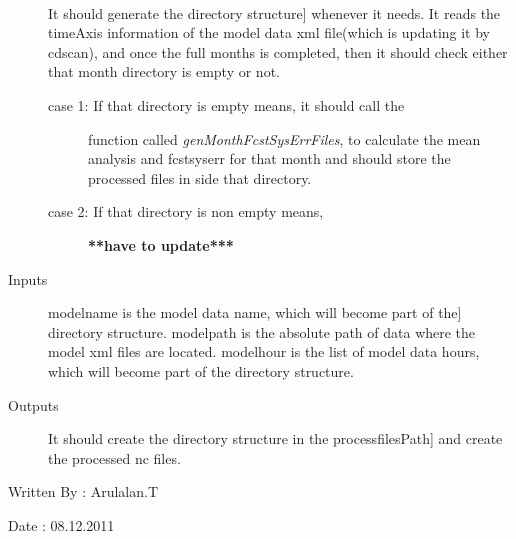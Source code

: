 \documentclass[letterpaper,10pt,english]{sphinxmanual}
\begin{document}
\begin{fulllineitems}
\label{diagnosis:compute_month_fcst_sys_error.genMonthFcstSysErrDirs}~\begin{description}
\item[{}] \leavevmode{[}It should generate the directory structure{]}
whenever it needs. It reads the timeAxis information of the
model data xml file(which is updating it by cdscan), and once
the full months is completed, then it should check either that
month directory is empty or not.
\begin{description}
\item[{case 1: If that directory is empty means, it should call the}] \leavevmode
function called \emph{genMonthFcstSysErrFiles}, to calculate
the mean analysis and fcstsyserr for that month and should
store the processed files in side that directory.

\item[{case 2: If that directory is non empty means,}] \leavevmode
\textbf{**have to update***}

\end{description}

\item[{Inputs}] \leavevmode{[}modelname is the model data name, which will become part of the{]}
directory structure.
modelpath is the absolute path of data where the model xml files
are located.
modelhour is the list of model data hours, which will become
part of the directory structure.

\item[{Outputs}] \leavevmode{[}It should create the directory structure in the processfilesPath{]}
and create the processed nc files.

\end{description}

Written By : Arulalan.T

Date : 08.12.2011

\end{fulllineitems}

\end{document}
